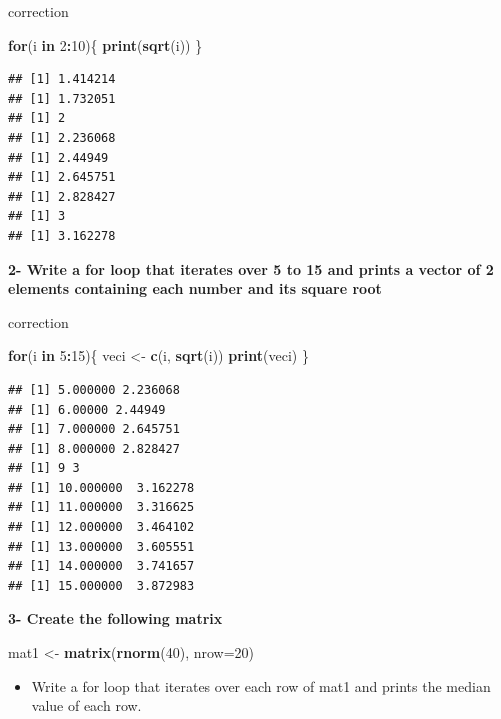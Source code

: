 \documentclass[]{book}
\newenvironment{Shaded}{\begin{snugshade}}{\end{snugshade}}
\newcommand{\ControlFlowTok}[1]{\textcolor[rgb]{0.13,0.29,0.53}{\textbf{#1}}}
\newcommand{\DataTypeTok}[1]{\textcolor[rgb]{0.13,0.29,0.53}{#1}}
\newcommand{\DecValTok}[1]{\textcolor[rgb]{0.00,0.00,0.81}{#1}}
\newcommand{\KeywordTok}[1]{\textcolor[rgb]{0.13,0.29,0.53}{\textbf{#1}}}
\newcommand{\NormalTok}[1]{#1}
\newcommand{\OperatorTok}[1]{\textcolor[rgb]{0.81,0.36,0.00}{\textbf{#1}}}
\newcommand{\StringTok}[1]{\textcolor[rgb]{0.31,0.60,0.02}{#1}}
\providecommand{\tightlist}{%
  \setlength{\itemsep}{0pt}\setlength{\parskip}{0pt}}
\begin{document}
correction

\begin{Shaded}
\begin{Highlighting}[]
\ControlFlowTok{for}\NormalTok{(i }\ControlFlowTok{in} \DecValTok{2}\OperatorTok{:}\DecValTok{10}\NormalTok{)\{}
    \KeywordTok{print}\NormalTok{(}\KeywordTok{sqrt}\NormalTok{(i))}
\NormalTok{\}}
\end{Highlighting}
\end{Shaded}

\begin{verbatim}
## [1] 1.414214
## [1] 1.732051
## [1] 2
## [1] 2.236068
## [1] 2.44949
## [1] 2.645751
## [1] 2.828427
## [1] 3
## [1] 3.162278
\end{verbatim}

\textbf{2- Write a for loop that iterates over 5 to 15 and prints a vector of 2 elements containing each number and its square root}

correction

\begin{Shaded}
\begin{Highlighting}[]
\ControlFlowTok{for}\NormalTok{(i }\ControlFlowTok{in} \DecValTok{5}\OperatorTok{:}\DecValTok{15}\NormalTok{)\{}
\NormalTok{    veci <-}\StringTok{ }\KeywordTok{c}\NormalTok{(i, }\KeywordTok{sqrt}\NormalTok{(i))}
        \KeywordTok{print}\NormalTok{(veci)}
\NormalTok{\}}
\end{Highlighting}
\end{Shaded}

\begin{verbatim}
## [1] 5.000000 2.236068
## [1] 6.00000 2.44949
## [1] 7.000000 2.645751
## [1] 8.000000 2.828427
## [1] 9 3
## [1] 10.000000  3.162278
## [1] 11.000000  3.316625
## [1] 12.000000  3.464102
## [1] 13.000000  3.605551
## [1] 14.000000  3.741657
## [1] 15.000000  3.872983
\end{verbatim}

\textbf{3- Create the following matrix}

\begin{Shaded}
\begin{Highlighting}[]
\NormalTok{mat1 <-}\StringTok{ }\KeywordTok{matrix}\NormalTok{(}\KeywordTok{rnorm}\NormalTok{(}\DecValTok{40}\NormalTok{), }\DataTypeTok{nrow=}\DecValTok{20}\NormalTok{)}
\end{Highlighting}
\end{Shaded}

\begin{itemize}
\tightlist
\item
  Write a for loop that iterates over each row of mat1 and prints the median value of each row.
\end{itemize}
\end{document}
